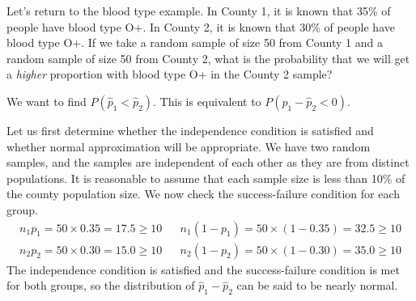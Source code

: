 \begin{examplewrap}
\begin{nexample}{
  Let's return to the blood type example.
  In County 1, it is known that 35\% of people have blood type O+.  In County 2, it is known that 30\% of people have blood type O+.  If we take a random sample of size 50 from County 1 and a random sample of size 50 from County 2, what is the probability that we will get a \emph{higher} proportion with blood type O+ in the County 2 sample?}

We want to find $P(\hat{p}_1<\hat{p}_2)$.  This is equivalent to $P(\hat{p}_1-\hat{p}_2<0)$. 

Let us first determine whether the independence condition is satisfied and whether normal approximation will be appropriate.  We have two random samples, and the samples are independent of each other as they are from distinct populations.  It is reasonable to assume that each sample size is less than 10\% of the county population size.  We now check the success-failure condition for each group.   
\begin{align*}
n_1 p_1 = 50 \times 0.35 = 17.5\ge 10 &&
    n_1 (1 - p_1) = 50 \times (1-0.35) = 32.5\ge 10\\
n_2 p_2 = 50 \times 0.30 = 15.0\ge 10 &&
    n_2 (1 - p_2) = 50 \times (1-0.30) = 35.0\ge 10
\end{align*}
The independence condition is satisfied and the success-failure condition is met for both groups, so the distribution of $\hat{p}_1-\hat{p}_2$ can be said to be nearly normal.  


\end{nexample}
\end{examplewrap}
